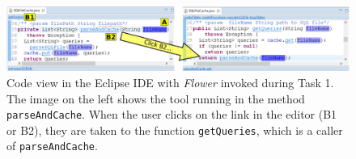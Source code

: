 \documentclass[conference]{IEEEtran}
\begin{document}
%

\begin{figure}
	\includegraphics[width=\textwidth]{images/toolScreenshot}
	\caption{Code view in the Eclipse IDE with \textit{Flower} invoked during Task 1. The image on the left shows the tool running in the method \texttt{parseAndCache}. When the user clicks on the link in the editor (B1 or B2), they are taken to the function \texttt{getQueries}, which is a caller of \texttt{parseAndCache}.}	
	\label{fig:tool} 
\end{figure}
\end{document}
